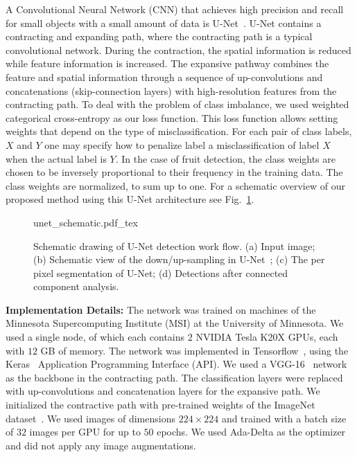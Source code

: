 A Convolutional Neural Network (CNN) that achieves high precision and recall for small objects with a small amount of data is U-Net~\cite{ronneberger_u-net:_2015}. U-Net contains a contracting and expanding path, where the contracting path is a typical convolutional network. During the contraction, the spatial information is reduced while feature information is increased. The expansive pathway combines the feature and spatial information through a sequence of up-convolutions and concatenations (skip-connection layers) with high-resolution features from the contracting path. To deal with the problem of class imbalance, we used weighted categorical cross-entropy as our loss function. This loss function allows setting weights that depend on the type of misclassification. For each pair of class labels, $X$ and $Y$ one may specify how to penalize label a misclassification of label $X$ when the actual label is $Y$. In the case of fruit detection, the class weights are chosen to be inversely proportional to their frequency in the training data. The class weights are normalized, to sum up to one. For a schematic overview of our proposed method using this U-Net architecture see Fig.~\ref{fig:unet_pipeline}.

\begin{figure}[!hbpt]
    \centering
    \def\svgwidth{\textwidth}
    {unet_schematic.pdf_tex}\label{fig:unet}
    \caption[Fruit detection by U-Net.]{Schematic drawing of U-Net detection work flow. (a) Input image; (b) Schematic view of the down/up-sampling in U-Net~\cite{ronneberger_u-net:_2015}; (c) The per pixel segmentation of U-Net; (d) Detections after connected component analysis.}
    \label{fig:unet_pipeline}
\end{figure}

\textbf{Implementation Details:} The network was trained on machines of the Minnesota Supercomputing Institute (MSI) at the University of Minnesota. We used a single node, of which each contains $2$ NVIDIA Tesla K20X GPUs, each with $12$ GB of memory. 
The network was implemented in Tensorflow~\cite{abadi_tensorflow:_2015}, using the Keras~\cite{chollet_keras_2015} Application Programming Interface (API). We used a VGG-16~\cite{simonyan_very_2015} network as the backbone in the contracting path. The classification layers were replaced with up-convolutions and concatenation layers for the expansive path. We initialized the contractive path with pre-trained weights of the ImageNet dataset~\cite{russakovsky_imagenet_2015}. We used images of dimensions $224 \times 224$ and trained with a batch size of $32$ images per GPU for up to $50$ epochs. We used Ada-Delta as the optimizer and did not apply any image augmentations.


